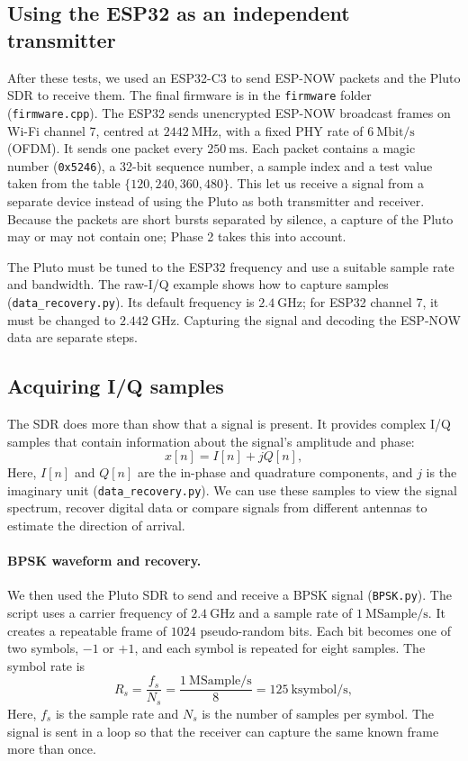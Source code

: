 \subsection{Using the ESP32 as an independent transmitter}

After these tests, we used an ESP32-C3 to send ESP-NOW packets and the Pluto
SDR to receive them. The final firmware is in the \texttt{firmware} folder
(\texttt{firmware.cpp}). The ESP32 sends unencrypted ESP-NOW broadcast frames
on Wi-Fi channel 7, centred at \(2442~\mathrm{MHz}\), with a fixed PHY rate of
\(6~\mathrm{Mbit/s}\) (OFDM). It sends one packet every \(250~\mathrm{ms}\).
Each packet contains a magic number (\texttt{0x5246}), a 32-bit sequence
number, a sample index and a test value taken from the table
\(\{120, 240, 360, 480\}\). This let us receive a signal from a separate
device instead of using the Pluto as both transmitter and receiver. Because
the packets are short bursts separated by silence, a capture of the Pluto
may or may not contain one; Phase 2 takes this into account.

The Pluto must be tuned to the ESP32 frequency and use a suitable sample rate
and bandwidth. The raw-I/Q example shows how to capture samples
(\texttt{data\_recovery.py}). Its default frequency is \(2.4~\mathrm{GHz}\);
for ESP32 channel 7, it must be changed to \(2.442~\mathrm{GHz}\). Capturing
the signal and decoding the ESP-NOW data are separate steps.

\subsection{Acquiring I/Q samples}

The SDR does more than show that a signal is present. It provides complex I/Q
samples that contain information about the signal's amplitude and phase:
\[
    x[n] = I[n] + jQ[n],
\]
Here, \(I[n]\) and \(Q[n]\) are the in-phase and quadrature components, and
\(j\) is the imaginary unit (\texttt{data\_recovery.py}). We can use these
samples to view the signal spectrum, recover digital data or compare signals
from different antennas to estimate the direction of arrival.

\paragraph{BPSK waveform and recovery.}

We then used the Pluto SDR to send and receive a BPSK signal
(\texttt{BPSK.py}). The script uses a carrier frequency of \(2.4~\mathrm{GHz}\)
and a sample rate of \(1~\mathrm{MSample/s}\). It creates a repeatable frame
of \(1024\) pseudo-random bits. Each bit becomes one of two symbols, \(-1\)
or \(+1\), and each symbol is repeated for eight samples. The symbol rate is
\[
    R_s = \frac{f_s}{N_s}
        = \frac{1~\mathrm{MSample/s}}{8}
        = 125~\mathrm{ksymbol/s},
\]
Here, \(f_s\) is the sample rate and \(N_s\) is the number of samples per
symbol. The signal is sent in a loop so that the receiver can capture the
same known frame more than once.

